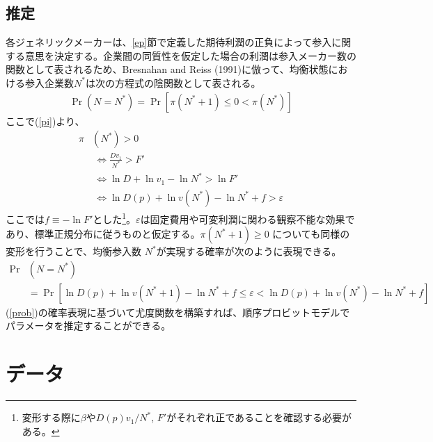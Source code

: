 \documentclass[a4j,10.5pt]{jarticle}
\begin{document}
\subsection{推定}
各ジェネリックメーカーは、\ref{ep}節で定義した期待利潤の正負によって参入に関する意思を決定する。企業間の同質性を仮定した場合の利潤は参入メーカー数の関数として表されるため、Bresnahan and Reiss (1991)に倣って、均衡状態における参入企業数$N^*$は次の方程式の陰関数として表される。
\begin{align}
    \Pr(N = N^*) = \Pr \left[ \pi(N^{*} + 1) \leq 0 < \pi(N^{*}) \right]
\end{align}
ここで(\ref{pi})より、
\begin{align}
    \pi &(N^{*}) > 0 \nonumber \\
    & \ \Leftrightarrow \frac{Dv_1}{N^{*}} > F' \nonumber \\
    & \ \Leftrightarrow \ln D + \ln v_1  - \ln N^{*} > \ln F' \nonumber \\
    & \ \Leftrightarrow \ln D(p) + \ln v(N^*) - \ln N^{*} + f > \varepsilon
\end{align}
ここでは$f \equiv -\ln F'$とした\footnote{変形する際に$\beta$や$D(p) v_1/N^{*}$, $F'$がそれぞれ正であることを確認する必要がある。}。$\varepsilon$は固定費用や可変利潤に関わる観察不能な効果であり、標準正規分布に従うものと仮定する。$\pi(N^{*}+1) \geq 0$ についても同様の変形を行うことで、均衡参入数 $N^*$が実現する確率が次のように表現できる。
\begin{align}
    \label{prob}
    \Pr &(N = N^*) \nonumber \\
    &= \Pr \left[ \ln D(p) + \ln v(N^{*}+1) - \ln N^{*} + f \leq \varepsilon < \ln D(p) + \ln v(N^{*}) - \ln N^{*} + f \right]
\end{align}
(\ref{prob})の確率表現に基づいて尤度関数を構築すれば、順序プロビットモデルでパラメータを推定することができる。

\section{データ}
\end{document}
